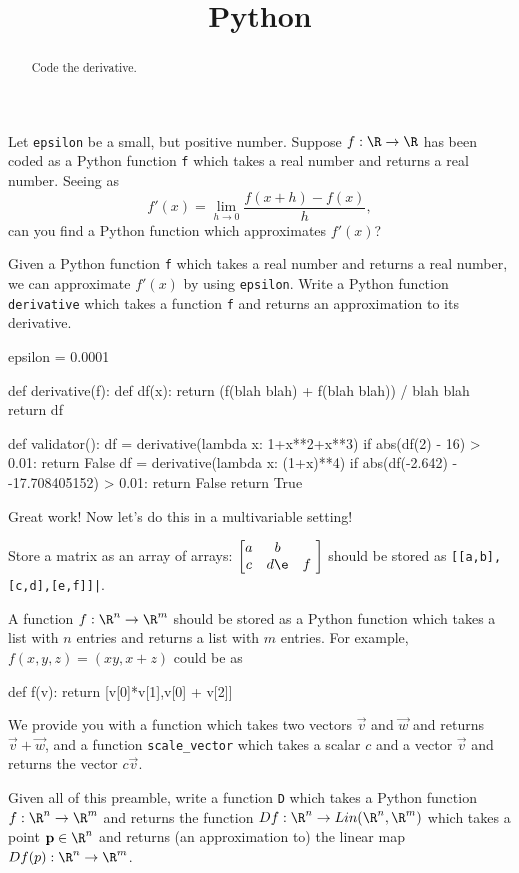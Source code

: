 \documentclass{ximera}
\title{Python}
\begin{document}
\begin{abstract}
  Code the derivative.	
\end{abstract}

\begin{exercise}
  Let \texttt{epsilon} be a small, but positive number.  Suppose $f:\R
  \to \R$ has been coded as a Python function \texttt{f} which takes a
  real number and returns a real number.  Seeing as
  $$
  f'(x) = \lim_{h \to 0} \frac{f(x+h) - f(x)}{h},
  $$
  can you find a Python function which approximates $f'(x)$?

  Given a Python function \texttt{f} which takes a real number and
  returns a real number, we can approximate $f'(x)$ by using
  \texttt{epsilon}.  Write a Python function \texttt{derivative} which
  takes a function \texttt{f} and returns an approximation to its
  derivative.

\begin{python}
epsilon = 0.0001

def derivative(f):
  def df(x): return (f(blah blah) + f(blah blah)) / blah blah
  return df

def validator():
  df = derivative(lambda x: 1+x**2+x**3)
  if abs(df(2) - 16) > 0.01:
    return False
  df = derivative(lambda x: (1+x)**4)
  if abs(df(-2.642) - -17.708405152) > 0.01:
    return False
  return True
\end{python}

  Great work!  Now let's do this in a multivariable setting!

  Store a matrix as an array of arrays: $\begin{bmatrix} a&b\\c&d
    \e&f\ \end{bmatrix}$ should be stored as
  \texttt{[[a,b],[c,d],[e,f]]|}.

  A function $f:\R^n \to \R^m$ should be stored as a Python function
  which takes a list with $n$ entries and returns a list with $m$
  entries.  For example, $f(x,y,z) = (xy,x+z)$ could be as
  \begin{pre}
def f(v):
  return [v[0]*v[1],v[0] + v[2]]
\end{pre}
	
We provide you with a function  which takes two
vectors $\vec{v}$ and $\vec{w}$ and returns $\vec{v}+\vec{w}$, and a
function \texttt{scale_vector} which takes a scalar $c$ and a vector
$\vec{v}$ and returns the vector $c\vec{v}$.

Given all of this preamble, write a function \texttt{D} which takes a
Python function $f: \R^n \to \R^m$ and returns the function $Df: \R^n
\to Lin(\R^n,\R^m)$ which takes a point $\mathbf{p} \in \R^n$ and
returns (an approximation to) the linear map $Df(p):\R^n \to \R^m$.
	

\end{exercise}
\end{document}

